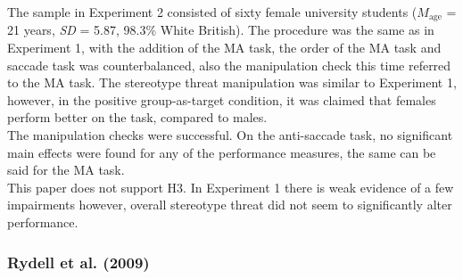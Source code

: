 \documentclass[
  stu,floatsintext]{apa7}
\begin{document}
The sample in Experiment 2 consisted of sixty female university students (\(M_{\text{age}}\) = 21 years, \emph{SD} = 5.87, 98.3\% White British).
The procedure was the same as in Experiment 1, with the addition of the MA task, the order of the MA task and saccade task was counterbalanced, also the manipulation check this time referred to the MA task.
The stereotype threat manipulation was similar to Experiment 1, however, in the positive group-as-target condition, it was claimed that females perform better on the task, compared to males.\\
The manipulation checks were successful.
On the anti-saccade task, no significant main effects were found for any of the performance measures, the same can be said for the MA task.\\
This paper does not support H3. In Experiment 1 there is weak evidence of a few impairments however, overall stereotype threat did not seem to significantly alter performance.

\subsubsection{Rydell et al. (2009)}\label{rydellmultiplesocialidentities2009}
\end{document}
